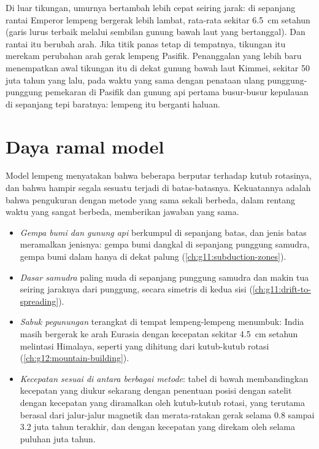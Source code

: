 Di luar tikungan, umurnya bertambah lebih cepat seiring jarak: di sepanjang
rantai Emperor lempeng bergerak lebih lambat, rata-rata sekitar \qty{6.5}{cm}
setahun (garis lurus terbaik melalui sembilan gunung bawah laut yang bertanggal).
Dan rantai itu berubah arah. Jika titik panas tetap di tempatnya, tikungan itu
merekam perubahan arah gerak lempeng Pasifik. Penanggalan yang lebih baru
menempatkan awal tikungan itu di dekat gunung bawah laut Kimmei, sekitar 50 juta
tahun yang lalu, pada waktu yang sama dengan penataan ulang punggung-punggung
pemekaran di Pasifik dan gunung api pertama busur-busur kepulauan di sepanjang
tepi baratnya: lempeng itu berganti haluan.

\section{Daya ramal model}\label{sec:g11:plate-motions:predictive}

Model lempeng menyatakan bahwa beberapa  berputar terhadap kutub
rotasinya, dan bahwa hampir segala sesuatu terjadi di batas-batasnya.
Kekuatannya adalah bahwa pengukuran dengan metode yang sama sekali berbeda,
dalam rentang waktu yang sangat berbeda, memberikan jawaban yang sama.

\begin{itemize}
  \item \emph{Gempa bumi dan gunung api} berkumpul di sepanjang batas, dan jenis
        batas meramalkan jenisnya: gempa bumi dangkal di sepanjang punggung
        samudra, gempa bumi dalam hanya di dekat palung (\cref{ch:g11:subduction-zones}).
  \item \emph{Dasar samudra} paling muda di sepanjang punggung samudra dan makin
        tua seiring jaraknya dari punggung, secara simetris di kedua sisi
        (\cref{ch:g11:drift-to-spreading}).
  \item \emph{Sabuk pegunungan} terangkat di tempat lempeng-lempeng menumbuk:
        India masih bergerak ke arah Eurasia dengan kecepatan sekitar
        \qty{4.5}{cm} setahun melintasi Himalaya, seperti yang dihitung dari
        kutub-kutub rotasi (\cref{ch:g12:mountain-building}).
  \item \emph{Kecepatan sesuai di antara berbagai metode}: tabel di bawah
        membandingkan kecepatan yang diukur sekarang dengan penentuan posisi
        dengan satelit dengan kecepatan yang diramalkan oleh kutub-kutub
        rotasi, yang  terutama berasal dari jalur-jalur
        magnetik dan merata-ratakan gerak selama \num{0.8} sampai \num{3.2}
        juta tahun terakhir, dan dengan kecepatan yang direkam oleh  selama puluhan juta tahun.
\end{itemize}

